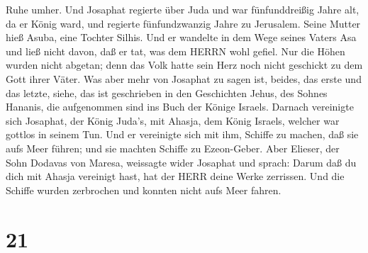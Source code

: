 Ruhe umher.  Und Josaphat regierte über Juda und war
fünfunddreißig Jahre alt, da er König ward, und regierte fünfundzwanzig
Jahre zu Jerusalem. Seine Mutter hieß Asuba, eine Tochter Silhis.
 Und er wandelte in dem Wege seines Vaters Asa und ließ
nicht davon, daß er tat, was dem HERRN wohl gefiel.  Nur
die Höhen wurden nicht abgetan; denn das Volk hatte sein Herz noch nicht
geschickt zu dem Gott ihrer Väter.  Was aber mehr von
Josaphat zu sagen ist, beides, das erste und das letzte, siehe, das ist
geschrieben in den Geschichten Jehus, des Sohnes Hananis, die
aufgenommen sind ins Buch der Könige Israels.  Darnach
vereinigte sich Josaphat, der König Juda's, mit Ahasja, dem König
Israels, welcher war gottlos in seinem Tun.  Und er
vereinigte sich mit ihm, Schiffe zu machen, daß sie aufs Meer führen;
und sie machten Schiffe zu Ezeon-Geber.  Aber Elieser, der
Sohn Dodavas von Maresa, weissagte wider Josaphat und sprach: Darum daß
du dich mit Ahasja vereinigt hast, hat der HERR deine Werke zerrissen.
Und die Schiffe wurden zerbrochen und konnten nicht aufs Meer fahren.

\hypertarget{section-20}{%
\section{21}\label{section-20}}

